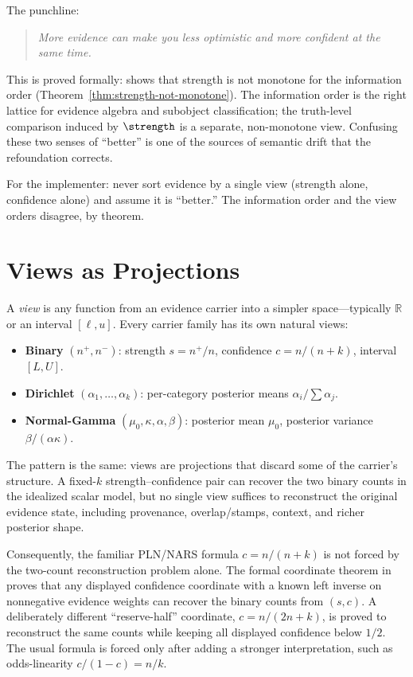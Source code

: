 \documentclass[11pt,openany]{report}
\begin{document}
\noindent
The punchline:
\begin{quote}
\emph{More evidence can make you less optimistic and more confident at
the same time.}
\end{quote}

\noindent
This is proved formally: 
shows that strength is not monotone for the information order
(Theorem~\ref{thm:strength-not-monotone}).  The information order is the
right lattice for evidence algebra and subobject classification; the
truth-level comparison induced by $\strength$ is a separate, non-monotone
view.  Confusing these two senses of ``better'' is one of the sources of
semantic drift that the refoundation corrects.

For the implementer: never sort evidence by a single view (strength alone,
confidence alone) and assume it is ``better.''  The information order and
the view orders disagree, by theorem.

\section{Views as Projections}

A \emph{view} is any function from an evidence carrier into a simpler
space---typically $\mathbb{R}$ or an interval $[\ell, u]$.  Every
carrier family has its own natural views:

\begin{itemize}
\item \textbf{Binary} $(n^+, n^-)$: strength $s = n^+/n$, confidence $c = n/(n+k)$, interval $[L, U]$.
\item \textbf{Dirichlet} $(\alpha_1, \ldots, \alpha_k)$: per-category posterior means $\alpha_i / \sum \alpha_j$.
\item \textbf{Normal-Gamma} $(\mu_0, \kappa, \alpha, \beta)$: posterior mean $\mu_0$, posterior variance $\beta / (\alpha \kappa)$.
\end{itemize}

\noindent
The pattern is the same: views are projections that discard some of the
carrier's structure.  A fixed-$k$ strength--confidence pair can recover
the two binary counts in the idealized scalar model, but no single
view suffices to reconstruct the original evidence state, including
provenance, overlap/stamps, context, and richer posterior shape.

Consequently, the familiar PLN/NARS formula $c=n/(n+k)$ is not forced
by the two-count reconstruction problem alone.  The formal coordinate
theorem in  proves
that any displayed confidence coordinate with a known left inverse on
nonnegative evidence weights can recover the binary counts from
$(s,c)$.  A deliberately different ``reserve-half'' coordinate,
$c=n/(2n+k)$, is proved to reconstruct the same counts while keeping
all displayed confidence below $1/2$.  The usual formula is forced only
after adding a stronger interpretation, such as odds-linearity
$c/(1-c)=n/k$.
\end{document}
